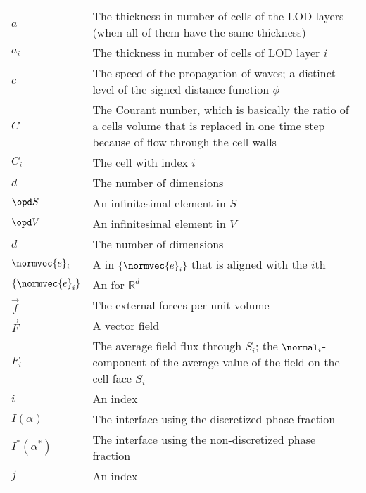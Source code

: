 \begin{center}
\begin{longtabu}{l X}
        \\
        
        $a$                 & The thickness in number of cells of the LOD layers
                              (when all of them have the same thickness) \\
        $a_i$               & The thickness in number of cells of LOD layer $i$ \\
        $c$                 & The speed of the propagation of waves;
                              a distinct level of the signed distance function $\phi$ \\
        $C$                 & The Courant number, which is basically the ratio of a cells volume that
                              is replaced in one time step because of flow through the cell walls \\
        $C_i$               & The cell with index $i$ \\
        $d$                 & The number of dimensions \\
        $\opd S$            & An infinitesimal element in $S$ \\
        $\opd V$            & An infinitesimal element in $V$ \\
        $d$                 & The number of dimensions \\
        $\normvec{e}_i$     & A  in $\{\normvec{e}_i\}$ that is aligned
                              with the $i$th  \\
        $\{\normvec{e}_i\}$ & An  for $\mathbb{R}^d$ \\
        $\vec{f}$           & The external forces per unit volume \\
        $\vec{F}$           & A vector field \\
        $F_i$               & The average field flux through $S_i$;
                              the $\normal_i$-component of the average value of the field on the cell face $S_i$ \\
        $i$                 & An index \\
        $I(\alpha)$         & The interface using the discretized phase fraction \\
        $I^*(\alpha^*)$     & The interface using the non-discretized phase fraction \\
        $j$                 & An index \\

\end{longtabu}
\end{center}
